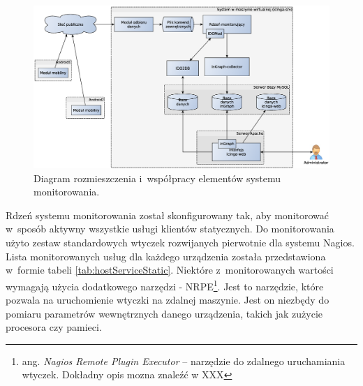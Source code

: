 \begin{figure}[ht]
  \caption{Diagram rozmieszczenia i~współpracy elementów systemu
    monitorowania.}
 \label{fig:deployment}
\includegraphics[width=1\textwidth]{img/deployment}
\end{figure}

Rdzeń systemu monitorowania został skonfigurowany tak, aby monitorować
w~sposób aktywny wszystkie usługi klientów statycznych. Do
monitorowania użyto zestaw standardowych wtyczek rozwijanych
pierwotnie dla systemu Nagios. Lista monitorowanych usług dla każdego
urządzenia została przedstawiona w~formie tabeli
\ref{tab:hostServiceStatic}. Niektóre z~monitorowanych wartości
wymagają użycia dodatkowego narzędzi - NRPE\footnote{ang. {\em Nagios
    Remote Plugin Executor} -- narzędzie do zdalnego uruchamiania
  wtyczek. Dokładny opis mozna znaleźć w XXX}. Jest to narzędzie,
które pozwala na uruchomienie wtyczki na zdalnej maszynie. Jest on
niezbędy do pomiaru parametrów wewnętrznych danego urządzenia, takich
jak zużycie procesora czy pamieci.

